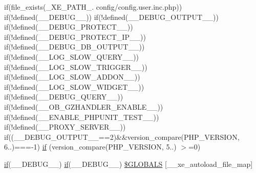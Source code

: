 \begin{DoxyCompactItemize}
if(file\+\_\+exists(\+\_\+\+X\+E\+\_\+\+P\+A\+T\+H\+\_\+. \textquotesingle{}config/config.\+user.\+inc.\+php\textquotesingle{})) if(!defined(\textquotesingle{}\+\_\+\+\_\+\+D\+E\+B\+U\+G\+\_\+\+\_\+\textquotesingle{})) if(!defined(\textquotesingle{}\+\_\+\+\_\+\+D\+E\+B\+U\+G\+\_\+\+O\+U\+T\+P\+U\+T\+\_\+\+\_\+\textquotesingle{})) if(!defined(\textquotesingle{}\+\_\+\+\_\+\+D\+E\+B\+U\+G\+\_\+\+P\+R\+O\+T\+E\+C\+T\+\_\+\+\_\+\textquotesingle{})) if(!defined(\textquotesingle{}\+\_\+\+\_\+\+D\+E\+B\+U\+G\+\_\+\+P\+R\+O\+T\+E\+C\+T\+\_\+\+I\+P\+\_\+\+\_\+\textquotesingle{})) if(!defined(\textquotesingle{}\+\_\+\+\_\+\+D\+E\+B\+U\+G\+\_\+\+D\+B\+\_\+\+O\+U\+T\+P\+U\+T\+\_\+\+\_\+\textquotesingle{})) if(!defined(\textquotesingle{}\+\_\+\+\_\+\+L\+O\+G\+\_\+\+S\+L\+O\+W\+\_\+\+Q\+U\+E\+R\+Y\+\_\+\+\_\+\textquotesingle{})) if(!defined(\textquotesingle{}\+\_\+\+\_\+\+L\+O\+G\+\_\+\+S\+L\+O\+W\+\_\+\+T\+R\+I\+G\+G\+E\+R\+\_\+\+\_\+\textquotesingle{})) if(!defined(\textquotesingle{}\+\_\+\+\_\+\+L\+O\+G\+\_\+\+S\+L\+O\+W\+\_\+\+A\+D\+D\+O\+N\+\_\+\+\_\+\textquotesingle{})) if(!defined(\textquotesingle{}\+\_\+\+\_\+\+L\+O\+G\+\_\+\+S\+L\+O\+W\+\_\+\+W\+I\+D\+G\+E\+T\+\_\+\+\_\+\textquotesingle{})) if(!defined(\textquotesingle{}\+\_\+\+\_\+\+D\+E\+B\+U\+G\+\_\+\+Q\+U\+E\+R\+Y\+\_\+\+\_\+\textquotesingle{})) if(!defined(\textquotesingle{}\+\_\+\+\_\+\+O\+B\+\_\+\+G\+Z\+H\+A\+N\+D\+L\+E\+R\+\_\+\+E\+N\+A\+B\+L\+E\+\_\+\+\_\+\textquotesingle{})) if(!defined(\textquotesingle{}\+\_\+\+\_\+\+E\+N\+A\+B\+L\+E\+\_\+\+P\+H\+P\+U\+N\+I\+T\+\_\+\+T\+E\+S\+T\+\_\+\+\_\+\textquotesingle{})) if(!defined(\textquotesingle{}\+\_\+\+\_\+\+P\+R\+O\+X\+Y\+\_\+\+S\+E\+R\+V\+E\+R\+\_\+\+\_\+\textquotesingle{})) if((\+\_\+\+\_\+\+D\+E\+B\+U\+G\+\_\+\+O\+U\+T\+P\+U\+T\+\_\+\+\_\+==2)\&\&version\+\_\+compare(P\+H\+P\+\_\+\+V\+E\+R\+S\+I\+ON, \textquotesingle{}6..\textquotesingle{})===-\/1) \hyperlink{config_8inc_8php_ac202e21c80d0f28d495d074d3c23e1ca}{if} (version\+\_\+compare(P\+H\+P\+\_\+\+V\+E\+R\+S\+I\+ON, \textquotesingle{}5..\textquotesingle{}) $>$=0)
\item 
\hyperlink{menu_2tpl_2js_2jquery_8jstree_8js_acba95bef569cfaee32c4ed0212b2bb92}{if}(\+\_\+\+\_\+\+D\+E\+B\+U\+G\+\_\+\+\_\+) \hyperlink{menu_2tpl_2js_2jquery_8jstree_8js_acba95bef569cfaee32c4ed0212b2bb92}{if}(\+\_\+\+\_\+\+D\+E\+B\+U\+G\+\_\+\+\_\+) \hyperlink{config_8inc_8php_a2843c2516649b5d9554f09b06b7b810a}{\$\+G\+L\+O\+B\+A\+LS} \mbox{[}\textquotesingle{}\+\_\+\+\_\+xe\+\_\+autoload\+\_\+file\+\_\+map\textquotesingle{}\mbox{]}
\end{DoxyCompactItemize}


